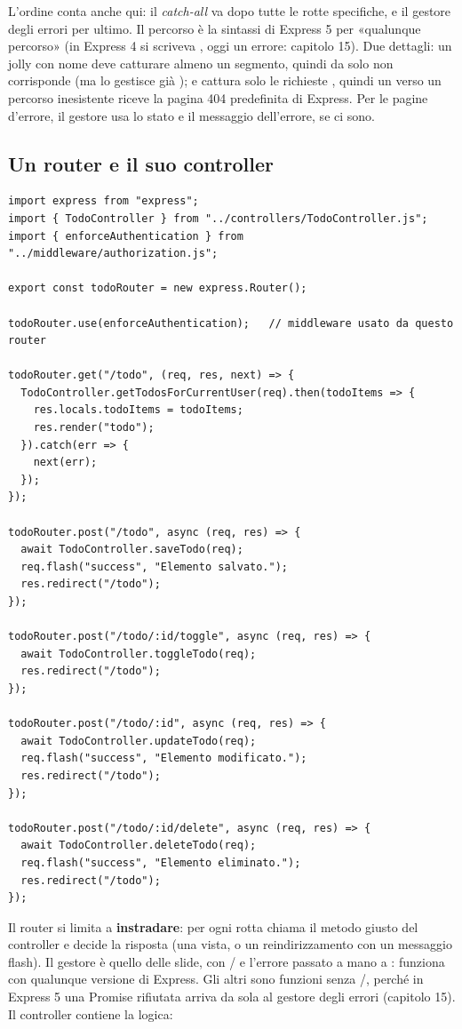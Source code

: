 L'ordine conta anche qui: il \textit{catch-all} va dopo tutte le rotte
specifiche, e il gestore degli errori per ultimo. Il percorso 
è la sintassi di Express 5 per «qualunque percorso» (in Express 4 si scriveva
, oggi un errore: capitolo 15). Due dettagli: un jolly con nome deve
catturare almeno un segmento, quindi \code{/} da solo non corrisponde (ma lo
gestisce già ); e  cattura solo le
richieste , quindi un  verso un percorso inesistente
riceve la pagina 404 predefinita di Express. Per le pagine d'errore, il
gestore usa lo stato e il messaggio dell'errore, se ci sono.

\subsection{Un router e il suo controller}

\begin{lstlisting}[style=js, name=routes/todoRouter.js]
import express from "express";
import { TodoController } from "../controllers/TodoController.js";
import { enforceAuthentication } from "../middleware/authorization.js";

export const todoRouter = new express.Router();

todoRouter.use(enforceAuthentication);   // middleware usato da questo router

todoRouter.get("/todo", (req, res, next) => {
  TodoController.getTodosForCurrentUser(req).then(todoItems => {
    res.locals.todoItems = todoItems;
    res.render("todo");
  }).catch(err => {
    next(err);
  });
});

todoRouter.post("/todo", async (req, res) => {
  await TodoController.saveTodo(req);
  req.flash("success", "Elemento salvato.");
  res.redirect("/todo");
});

todoRouter.post("/todo/:id/toggle", async (req, res) => {
  await TodoController.toggleTodo(req);
  res.redirect("/todo");
});

todoRouter.post("/todo/:id", async (req, res) => {
  await TodoController.updateTodo(req);
  req.flash("success", "Elemento modificato.");
  res.redirect("/todo");
});

todoRouter.post("/todo/:id/delete", async (req, res) => {
  await TodoController.deleteTodo(req);
  req.flash("success", "Elemento eliminato.");
  res.redirect("/todo");
});
\end{lstlisting}

Il router si limita a \textbf{instradare}: per ogni rotta chiama il metodo
giusto del controller e decide la risposta (una vista, o un reindirizzamento con
un messaggio flash). Il gestore  è quello delle slide, con
/ e l'errore passato a mano a : funziona con
qualunque versione di Express. Gli altri sono funzioni  senza
/, perché in Express 5 una Promise rifiutata arriva da sola
al gestore degli errori (capitolo 15). Il controller contiene la logica:

